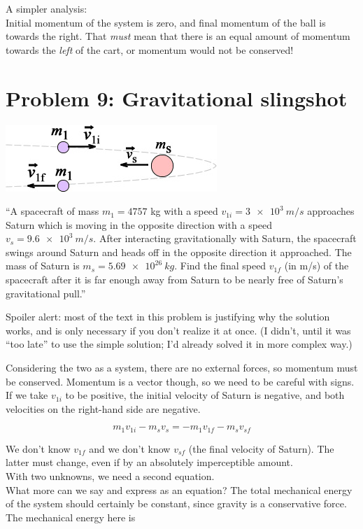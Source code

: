 \documentclass[8.01x]{subfiles}
\begin{document}
A simpler analysis:\\
Initial momentum of the system is zero, and final momentum of the ball is towards the right. That \emph{must} mean that there is an equal amount of momentum towards the \emph{left} of the cart, or momentum would not be conserved!

\section{Problem 9: Gravitational slingshot}

\begin{center}
\includegraphics[scale=0.8]{Graphics/h6p9}
\end{center}

``A spacecraft of mass $m_1 = 4757$ kg with a speed $v_{1i} = \SI{3e3}{m/s}$ approaches Saturn which is moving in the opposite direction with a speed $v_s = \SI{9.6e3}{m/s}$. After interacting gravitationally with Saturn, the spacecraft swings around Saturn and heads off in the opposite direction it approached. The mass of Saturn is $m_s = \SI{5.69e26}{kg}$. Find the final speed $v_{1f}$ (in m/s) of the spacecraft after it is far enough away from Saturn to be nearly free of Saturn's gravitational pull.''

Spoiler alert: most of the text in this problem is justifying why the solution works, and is only necessary if you don't realize it at once. (I didn't, until it was ``too late'' to use the simple solution; I'd already solved it in more complex way.)

Considering the two as a system, there are no external forces, so momentum must be conserved. Momentum is a vector though, so we need to be careful with signs. If we take $v_{1i}$ to be positive, the initial velocity of Saturn is negative, and both velocities on the right-hand side are negative.

\begin{equation}
m_1 v_{1i} - m_s v_s = - m_1 v_{1f} - m_s v_{sf}
\end{equation}

We don't know $v_{1f}$ and we don't know $v_{sf}$ (the final velocity of Saturn). The latter must change, even if by an absolutely imperceptible amount.\\
With two unknowns, we need a second equation.\\
What more can we say and express as an equation? The total mechanical energy of the system should certainly be constant, since gravity is a conservative force. The mechanical energy here is
\end{document}
